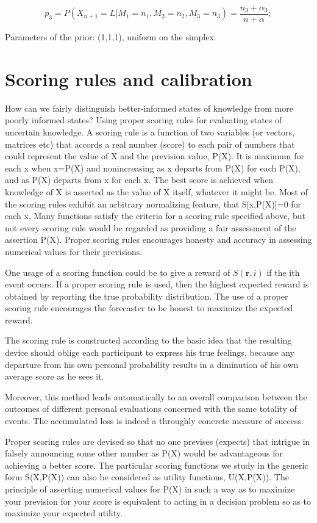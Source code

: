 \documentclass[journal,article,accept,moreauthors,pdftex,12pt,a4paper]{mdpi}
\begin{document}
\[p_3=P(X_{n+1}=L|M_1=n_1,M_2=n_2,M_3=n_3)=\frac{n_3+\alpha_3}{n+\alpha};\]

Parameters of the prior: (1,1,1), uniform on the simplex.

\section{Scoring rules and calibration}

How can we fairly distinguish better-informed states of knowledge from more poorly informed states?
Using proper scoring rules for evaluating states of uncertain knowledge.
A scoring rule is a function of two variables (or vectors, matrices etc) that accords a real number (score) to each pair of numbers that could represent the value of X and the prevision value, P(X).
It is maximum for each x when x=P(X) and nonincreasing as x departs from P(X) for each P(X), and as P(X) departs from x for each x.
The best score is achieved when knowledge of X is asserted as the value of X itself, whatever it might be.
Most of the scoring rules exhibit an arbitrary normalizing feature, that S[x,P(X)]=0 for each x.
Many functions satisfy the criteria for a scoring rule specified above, but not every scoring rule would be regarded as providing a fair assessment of the assertion P(X).
Proper scoring rules encourages honesty and accuracy in assessing numerical values for their previsions.

One usage of a scoring function could be to give a reward of $S(\mathbf{r},i)$ if the ith event occurs. If a proper scoring rule is used, then the highest expected reward is obtained by reporting the true probability distribution. The use of a proper scoring rule encourages the forecaster to be honest to maximize the expected reward.

The scoring rule is constructed according to the basic idea that the resulting device should oblige each participant to express his true feelings, because any departure from his own personal probability results in a diminution of his own average score as he sees it.

Moreover, this method leads automatically to an overall comparison between the outcomes of different personal evaluations concerned with the same totality of events.
The accumulated loss is indeed a throughly concrete measure of success.

Proper scoring rules are devised so that no one previses (expects) that intrigue in falsely announcing some other number as P(X) would be advantageous for achieving a better score.
The particular scoring functions we study in the generic form S(X,P(X)) can also be considered as utility functions, U(X,P(X)).
The principle of asserting numerical values for P(X) in such a way as to maximize your prevision for your score is equivalent to acting in a decision problem so as to maximize your expected utility.
\end{document}
